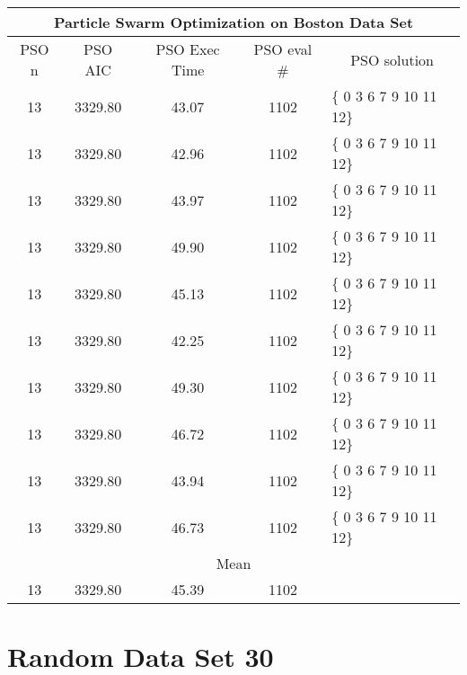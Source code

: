 \begin{tabular}{|c|c|c|c|l|}
	\hline
	\multicolumn{5}{|c|}{Particle Swarm Optimization on Boston Data Set}                                 \\ \hline
	PSO n & PSO AIC    & PSO Exec Time & PSO eval \# & \multicolumn{1}{c|}{PSO solution} \\ \hline
	13    & 3329.80 & 43.07              & 1102                   & \{ 0 3 6 7 9 10 11 12\}           \\ \hline
	13    & 3329.80 & 42.96             & 1102                   & \{ 0 3 6 7 9 10 11 12\}           \\ \hline
	13    & 3329.80 & 43.97             & 1102                   & \{ 0 3 6 7 9 10 11 12\}           \\ \hline
	13    & 3329.80 & 49.90             & 1102                   & \{ 0 3 6 7 9 10 11 12\}           \\ \hline
	13    & 3329.80 & 45.13             & 1102                   & \{ 0 3 6 7 9 10 11 12\}           \\ \hline
	13    & 3329.80 & 42.25             & 1102                   & \{ 0 3 6 7 9 10 11 12\}           \\ \hline
	13    & 3329.80 & 49.30             & 1102                   & \{ 0 3 6 7 9 10 11 12\}           \\ \hline
	13    & 3329.80 & 46.72             & 1102                   & \{ 0 3 6 7 9 10 11 12\}           \\ \hline
	13    & 3329.80 & 43.94             & 1102                   & \{ 0 3 6 7 9 10 11 12\}           \\ \hline
	13    & 3329.80 & 46.73              & 1102                   & \{ 0 3 6 7 9 10 11 12\}           \\ \hline
	\multicolumn{5}{|c|}{Mean}                                                                           \\ \hline
	13    & 3329.80 & 45.39            & 1102                   &                                   \\ \hline
\end{tabular}

\section{Random Data Set 30}
